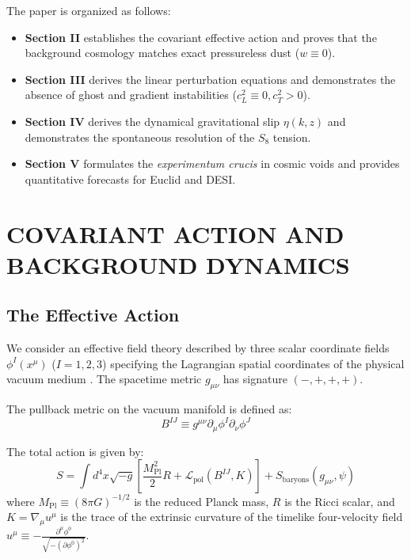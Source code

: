 \documentclass[10pt,twocolumn]{article}
\begin{document}
The paper is organized as follows:
\begin{itemize}
  \item \textbf{Section II} establishes the covariant effective action and proves that the background cosmology matches exact pressureless dust ($w \equiv 0$).
  \item \textbf{Section III} derives the linear perturbation equations and demonstrates the absence of ghost and gradient instabilities ($c_L^2 \equiv 0, c_T^2 > 0$).
  \item \textbf{Section IV} derives the dynamical gravitational slip $\eta(k,z)$ and demonstrates the spontaneous resolution of the $S_8$ tension.
  \item \textbf{Section V} formulates the \textit{experimentum crucis} in cosmic voids and provides quantitative forecasts for Euclid and DESI.
\end{itemize}



\section{COVARIANT ACTION AND BACKGROUND DYNAMICS}


\subsection{The Effective Action}

We consider an effective field theory described by three scalar coordinate fields $\phi^I(x^\mu)$ ($I = 1, 2, 3$) specifying the Lagrangian spatial coordinates of the physical vacuum medium \cite{Dubovsky2006}. The spacetime metric $g_{\mu\nu}$ has signature $(-, +, +, +)$.

The pullback metric on the vacuum manifold is defined as:
\begin{equation}
  B^{IJ} \equiv g^{\mu\nu} \partial_\mu \phi^I \partial_\nu \phi^J
\end{equation}

The total action is given by:
\begin{equation}
  S = \int d^4x \sqrt{-g} \left[ \frac{M_{\text{Pl}}^2}{2} R + \mathcal{L}_{\text{pol}}(B^{IJ}, K) \right] + S_{\text{baryons}}(g_{\mu\nu}, \psi)
\end{equation}
where $M_{\text{Pl}} \equiv (8\pi G)^{-1/2}$ is the reduced Planck mass, $R$ is the Ricci scalar, and $K = \nabla_\mu u^\mu$ is the trace of the extrinsic curvature of the timelike four-velocity field $u^\mu \equiv -\frac{\partial^\mu \phi^0}{\sqrt{-(\partial \phi^0)^2}}$.
\end{document}
